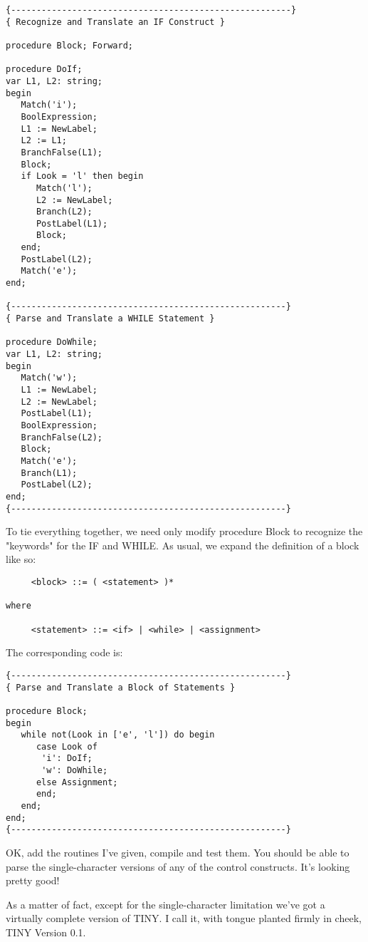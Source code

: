 \begin{verbatim}
{-------------------------------------------------------}
{ Recognize and Translate an IF Construct }

procedure Block; Forward;

procedure DoIf;
var L1, L2: string;
begin
   Match('i');
   BoolExpression;
   L1 := NewLabel;
   L2 := L1;
   BranchFalse(L1);
   Block;
   if Look = 'l' then begin
      Match('l');
      L2 := NewLabel;
      Branch(L2);
      PostLabel(L1);
      Block;
   end;
   PostLabel(L2);
   Match('e');
end;

{------------------------------------------------------}
{ Parse and Translate a WHILE Statement }

procedure DoWhile;
var L1, L2: string;
begin
   Match('w');
   L1 := NewLabel;
   L2 := NewLabel;
   PostLabel(L1);
   BoolExpression;
   BranchFalse(L2);
   Block;
   Match('e');
   Branch(L1);
   PostLabel(L2);
end;
{------------------------------------------------------}
\end{verbatim}

To tie everything  together, we need only modify procedure Block to recognize the "keywords" for the  IF  and WHILE. As usual, we expand the definition of a block like so:

\begin{verbatim}
     <block> ::= ( <statement> )*

where

     <statement> ::= <if> | <while> | <assignment>
\end{verbatim}

The corresponding code is:

\begin{verbatim}
{------------------------------------------------------}
{ Parse and Translate a Block of Statements }

procedure Block;
begin
   while not(Look in ['e', 'l']) do begin
      case Look of
       'i': DoIf;
       'w': DoWhile;
      else Assignment;
      end;
   end;
end;
{------------------------------------------------------}
\end{verbatim}

OK, add the routines I've given, compile and  test  them. You should be able to parse the single-character versions  of  any of the control constructs. It's looking pretty good!

As a matter  of  fact, except for the single-character limitation we've got a virtually complete version of TINY. I call  it, with tongue planted firmly in cheek, TINY Version 0.1.

